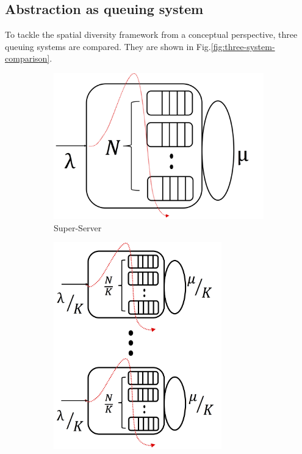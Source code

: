 \subsection{Abstraction as queuing system}
\label{sec:threesystemcomparison}
To tackle the spatial diversity framework from a conceptual perspective, three queuing systems are compared. They are shown in Fig.\ref{fig:three-system-comparison}. 
\begin{figure}
	\centering
	\begin{subfigure}[b]{0.3\textwidth}
		\centering
		\includegraphics[width=\textwidth]{Chapter3/Figures/switchone}
		\smallskip
		\caption{Super-Server}
		\label{fig:switchone}
	\end{subfigure}
	\hfill
	\begin{subfigure}[b]{0.3\textwidth}
		\centering
		\includegraphics[width=0.8\textwidth]{Chapter3/Figures/esn}

\end{subfigure}
\end{figure}
